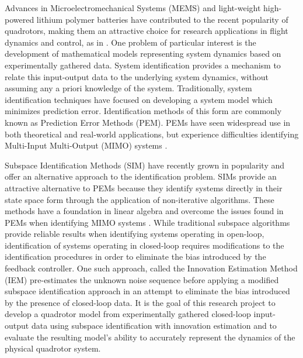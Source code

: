 Advances in Microelectromechanical Systems (MEMS) and light-weight high-powered lithium polymer batteries have contributed to the recent popularity of quadrotors, making them an attractive choice for research applications in flight dynamics and control, as in \cite{hoffmann2007quadrotor, kivrak2006design, mellinger2010control, michael2010grasp}. One problem of particular interest is the development of mathematical models representing system dynamics based on experimentally gathered data. System identification provides a mechanism to relate this input-output data to the underlying system dynamics, without assuming any a priori knowledge of the system. Traditionally, system identification techniques have focused on developing a system model which minimizes prediction error. Identification methods of this form are commonly known as Prediction Error Methods (PEM). PEMs have seen widespread use in both theoretical and real-world applications, but experience difficulties identifying Multi-Input Multi-Output (MIMO) systems \cite{qin2006overview, viberg1995subspace}. 

Subspace Identification Methods (SIM) have recently grown in popularity and offer an alternative approach to the identification problem. SIMs provide an attractive alternative to PEMs because they identify systems directly in their state space form through the application of non-iterative algorithms. These methods have a foundation in linear algebra and overcome the issues found in PEMs when identifying MIMO systems \cite{katayama2005subspace}. While traditional subspace algorithms provide reliable results when identifying systems operating in open-loop, identification of systems operating in closed-loop requires modifications to the identification procedures in order to eliminate the bias introduced by the feedback controller. One such approach, called the Innovation Estimation Method (IEM) pre-estimates the unknown noise sequence before applying a modified subspace identification approach in an attempt to eliminate the bias introduced by the presence of closed-loop data. It is the goal of this research project to develop a quadrotor model from experimentally gathered closed-loop input-output data using subspace identification with innovation estimation and to evaluate the resulting model's ability to accurately represent the dynamics of the physical quadrotor system.


